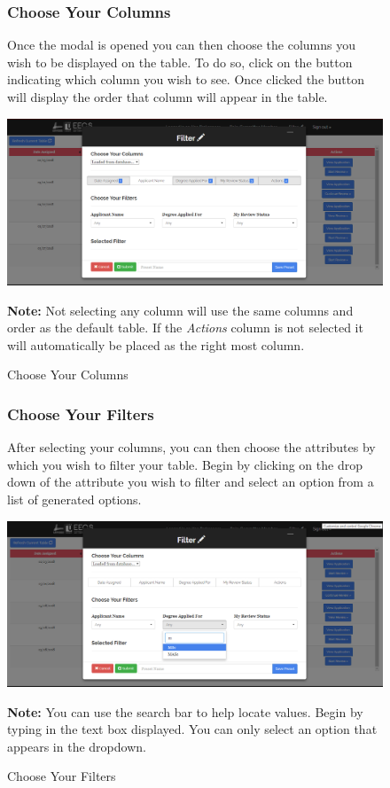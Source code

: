 \documentclass[fontsize=12pt,paper=letter,twoside]{scrartcl}
\begin{document}
\begin{figure}[!htb]
\subsubsection{Choose Your Columns}
Once the modal is opened you can then choose the columns you wish to be displayed on the table. To do so, click on the button indicating which column you wish to see. Once clicked the button will display the order that column will appear in the table.\begin{center}
\includegraphics[width=.99\textwidth]{images/selected_col.png}
\end{center}
\caption{Choose Your Columns}
\label{fig:choose_columns}
\textbf{Note:} Not selecting any column will use the same columns and order as the default table. If the \emph{Actions} column is not selected it will automatically be placed as the right most column. 
\end{figure}

\clearpage
\begin{figure}[!htb]
\subsubsection{Choose Your Filters}
After selecting your columns, you can then choose the attributes by which you wish to filter your table. Begin by clicking on the drop down of the attribute you wish to filter and select an option from a list of generated options.
\begin{center}
\includegraphics[width=.99\textwidth]{images/selected_filter.png}
\end{center}
\caption{Choose Your Filters}
\textbf{Note:} You can use the search bar to help locate values. Begin by typing in the text box displayed. You can only select an option that appears in the dropdown.
\label{fig:choose_filters}
\end{figure} 
\end{document}
